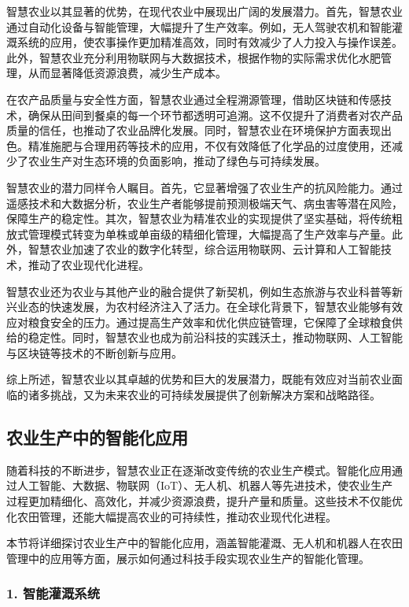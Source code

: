 智慧农业以其显著的优势，在现代农业中展现出广阔的发展潜力。首先，智慧农业通过自动化设备与智能管理，大幅提升了生产效率。例如，无人驾驶农机和智能灌溉系统的应用，使农事操作更加精准高效，同时有效减少了人力投入与操作误差。此外，智慧农业充分利用物联网与大数据技术，根据作物的实际需求优化水肥管理，从而显著降低资源浪费，减少生产成本。

在农产品质量与安全性方面，智慧农业通过全程溯源管理，借助区块链和传感技术，确保从田间到餐桌的每一个环节都透明可追溯。这不仅提升了消费者对农产品质量的信任，也推动了农业品牌化发展。同时，智慧农业在环境保护方面表现出色。精准施肥与合理用药等技术的应用，不仅有效降低了化学品的过度使用，还减少了农业生产对生态环境的负面影响，推动了绿色与可持续发展。

智慧农业的潜力同样令人瞩目。首先，它显著增强了农业生产的抗风险能力。通过遥感技术和大数据分析，农业生产者能够提前预测极端天气、病虫害等潜在风险，保障生产的稳定性。其次，智慧农业为精准农业的实现提供了坚实基础，将传统粗放式管理模式转变为单株或单亩级的精细化管理，大幅提高了生产效率与产量。此外，智慧农业加速了农业的数字化转型，综合运用物联网、云计算和人工智能技术，推动了农业现代化进程。

智慧农业还为农业与其他产业的融合提供了新契机，例如生态旅游与农业科普等新兴业态的快速发展，为农村经济注入了活力。在全球化背景下，智慧农业能够有效应对粮食安全的压力。通过提高生产效率和优化供应链管理，它保障了全球粮食供给的稳定性。同时，智慧农业也成为前沿科技的实践沃土，推动物联网、人工智能与区块链等技术的不断创新与应用。

综上所述，智慧农业以其卓越的优势和巨大的发展潜力，既能有效应对当前农业面临的诸多挑战，又为未来农业的可持续发展提供了创新解决方案和战略路径。


\subsection{农业生产中的智能化应用}

随着科技的不断进步，智慧农业正在逐渐改变传统的农业生产模式。智能化应用通过人工智能、大数据、物联网（IoT）、无人机、机器人等先进技术，使农业生产过程更加精细化、高效化，并减少资源浪费，提升产量和质量。这些技术不仅能优化农田管理，还能大幅提高农业的可持续性，推动农业现代化进程。

本节将详细探讨农业生产中的智能化应用，涵盖智能灌溉、无人机和机器人在农田管理中的应用等方面，展示如何通过科技手段实现农业生产的智能化管理。

\subsubsection{1. 智能灌溉系统}

